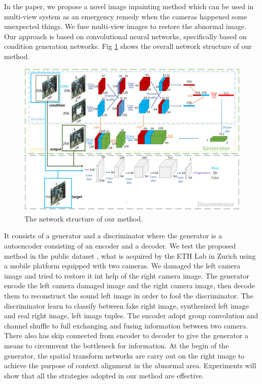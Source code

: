 \documentclass{IEEE_lsens}
\begin{document}
In the paper, we propose a novel image inpainting method which can be used in multi-view system as an emergency remedy when the cameras happened some unexpected things. We fuse multi-view images to restore the abnormal image. Our approach is based on convolutional neural networks, specifically based on condition generation networks. Fig \ref{fig:networkStruct} shows the overall network structure of our method. 
\begin{figure}[!t]
\centering
\includegraphics[width=6.5in]{networkStruct}
\caption{The network structure of our method.}
\label{fig:networkStruct}
\end{figure}
It consists of a generator and a discriminator where the generator is a autoencoder consisting of an encoder and a decoder. We test the proposed method in the public dataset \cite{Ess2008::mobile}, what is acquired by the ETH Lab in Zurich using a mobile platform equipped with two cameras. We damaged the left camera image and tried to restore it int help of the right camera image. The generator encode the left camera damaged image and the right camera image, then decode them to reconstruct the sound left image in order to fool the discriminator. The discriminator learn to classify between fake {right image, synthesized left image} and real {right image, left image} tuples. The encoder adopt group convolution and channel shuffle to full exchanging and fusing information between two camera. There also has skip connected from encoder to decoder to give the generator a means to circumvent the bottleneck for information. At the begin of the generator, the spatial transform networks are carry out on the right image to achieve the purpose of context alignment in the abnormal area. Experiments will show that all the strategies adopted in our method are effective.
\end{document}
